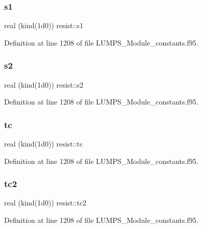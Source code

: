 \subsubsection{\texorpdfstring{s1}{s1}}
{\footnotesize\ttfamily real (kind(1d0)) resist\+::s1}



Definition at line 1208 of file L\+U\+M\+P\+S\+\_\+\+Module\+\_\+constants.\+f95.

\mbox{\label{namespaceresist_a0edd3d2ed03de65fa65ffe839661d97c}} 
\subsubsection{\texorpdfstring{s2}{s2}}
{\footnotesize\ttfamily real (kind(1d0)) resist\+::s2}



Definition at line 1208 of file L\+U\+M\+P\+S\+\_\+\+Module\+\_\+constants.\+f95.

\mbox{\label{namespaceresist_a018715832aa4e47e3fd4deb59e413da1}} 
\subsubsection{\texorpdfstring{tc}{tc}}
{\footnotesize\ttfamily real (kind(1d0)) resist\+::tc}



Definition at line 1208 of file L\+U\+M\+P\+S\+\_\+\+Module\+\_\+constants.\+f95.

\mbox{\label{namespaceresist_a39c5aa18f024567bd7365dbdfe6c7216}} 
\subsubsection{\texorpdfstring{tc2}{tc2}}
{\footnotesize\ttfamily real (kind(1d0)) resist\+::tc2}



Definition at line 1208 of file L\+U\+M\+P\+S\+\_\+\+Module\+\_\+constants.\+f95.

\mbox{\label{namespaceresist_a4a4f565342a527412998f585a5c126be}} 
